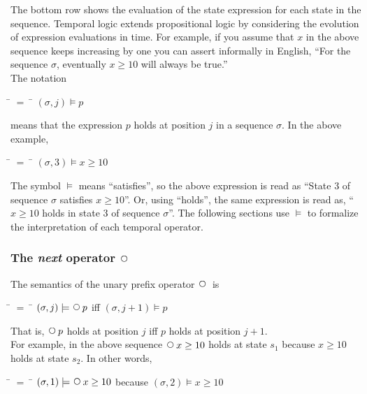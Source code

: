 \documentclass[fleqn, leqno]{article}
\newcommand{\mymathindent}{24pt}                    %
\newcommand{\Next}{\;\,\text{\raisebox{3.5pt}{\circle{6}}}}
\begin{document}
The bottom row shows the evaluation of the state expression for each state in the sequence.
Temporal logic extends propositional logic by considering the evolution of expression evaluations in time.
For example, if you assume that $x$ in the above sequence keeps increasing by one you can assert
informally in English, ``For the sequence $\sigma$, eventually $x\ge 10$ will always be true.''\\

The notation

\begin{tabbing}
\hspace{\mymathindent} \= $= \;$ \= \kill
  \> $(\sigma, j) \models p$
\end{tabbing}

means that the expression $p$ holds at position $j$ in a sequence $\sigma$.
In the above example,

\begin{tabbing}
\hspace{\mymathindent} \= $= \;$ \= \kill
  \> $(\sigma, 3) \models x\ge 10$
\end{tabbing}

The symbol $\models$ means ``satisfies'', so the above expression is read as
``State 3 of sequence $\sigma$ satisfies $x\ge 10$''.
Or, using ``holds'', the same expression is read as, ``$x\ge 10$ holds in state 3 of sequence $\sigma$''.
The following sections use $\models$ to formalize the interpretation of each temporal operator.

\subsubsection*{The \textit{next} operator $\Next$}

The semantics of the unary prefix operator $\Next$ is

\begin{tabbing}
\hspace{\mymathindent} \= $= \;$ \= \kill
  \> $(\sigma, j) \models \Next p$ \quad iff \quad $(\sigma, j+1) \models p$
\end{tabbing}

That is, $\Next p$ holds at position $j$ iff $p$ holds at position $j+1$.\\

For example, in the above sequence $\Next x \ge 10$ holds at state $s_1$ because $x \ge 10$
holds at state $s_2$.
In other words,

\begin{tabbing}
\hspace{\mymathindent} \= $= \;$ \= \kill
  \> $(\sigma, 1) \models \Next x \ge 10$ \quad because \quad $(\sigma, 2) \models  x \ge 10$
\end{tabbing}
\end{document}
